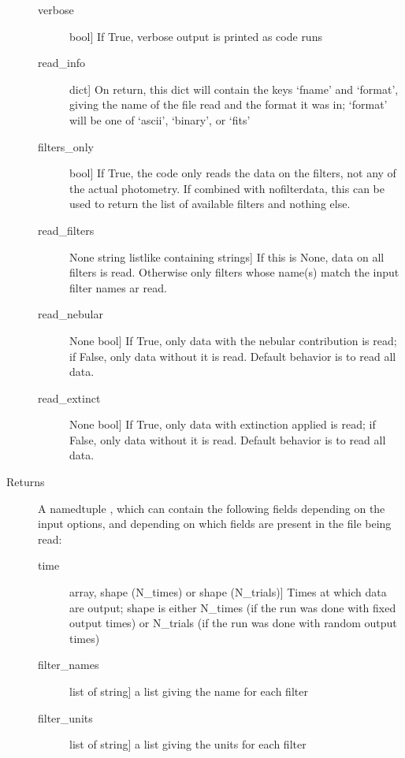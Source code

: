 \documentclass[letterpaper,10pt,english]{sphinxmanual}
\begin{document}
\begin{fulllineitems}
\begin{description}
\begin{description}
\item[{verbose}] \leavevmode{[}bool{]}
If True, verbose output is printed as code runs

\item[{read\_info}] \leavevmode{[}dict{]}
On return, this dict will contain the keys `fname' and
`format', giving the name of the file read and the format it
was in; `format' will be one of `ascii', `binary', or `fits'

\item[{filters\_only}] \leavevmode{[}bool{]}
If True, the code only reads the data on the filters, not
any of the actual photometry. If combined with nofilterdata,
this can be used to return the list of available filters
and nothing else.

\item[{read\_filters}] \leavevmode{[}None \textbar{} string \textbar{} listlike containing strings{]}
If this is None, data on all filters is read. Otherwise only
filters whose name(s) match the input filter names ar
read.

\item[{read\_nebular}] \leavevmode{[}None \textbar{} bool{]}
If True, only data with the nebular contribution is read; if
False, only data without it is read. Default behavior is to
read all data.

\item[{read\_extinct}] \leavevmode{[}None \textbar{} bool{]}
If True, only data with extinction applied is read; if
False, only data without it is read. Default behavior is to
read all data.

\end{description}

\item[{Returns}] \leavevmode
A namedtuple , which can contain the following fields depending
on the input options, and depending on which fields are present
in the file being read:
\begin{description}
\item[{time}] \leavevmode{[}array, shape (N\_times) or shape (N\_trials){]}
Times at which data are output; shape is either N\_times (if
the run was done with fixed output times) or N\_trials (if
the run was done with random output times)

\item[{filter\_names}] \leavevmode{[}list of string{]}
a list giving the name for each filter

\item[{filter\_units}] \leavevmode{[}list of string{]}
a list giving the units for each filter


\end{description}
\end{description}
\end{fulllineitems}
\end{document}
